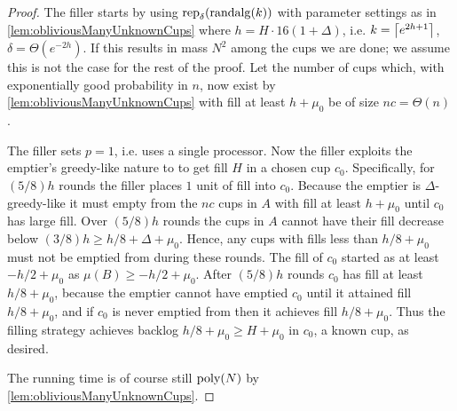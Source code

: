 \begin{proof}
  The filler starts by using $\operatorname{\text{\textup{rep}}}_\delta(\operatorname{\text{\textup{randalg}}}(k))$ with
  parameter settings as in \cref{lem:obliviousManyUnknownCups}
  where $h = H\cdot 16(1+\Delta)$, i.e. $k = \left\lceil e^{2h+1} \right\rceil$,
  $\delta = \Theta(e^{-2h})$. 
  If this results in mass $N^2$ among the cups we are done; we
  assume this is not the case for the rest of the proof.
  Let the number of cups which, with exponentially good
  probability in $n$, now exist by
  \cref{lem:obliviousManyUnknownCups} with
  fill at least $h+\mu_0$ be of size $nc = \Theta(n)$.

  The filler sets $p=1$, i.e. uses a single processor. Now the
  filler exploits the emptier's greedy-like nature to to get fill
  $H$ in a chosen cup $c_0$. Specifically, for $(5/8)h$ rounds
  the filler places $1$ unit of fill into $c_0$. Because the
  emptier is $\Delta$-greedy-like it must empty from the $nc$
  cups in $A$ with fill at least $h+\mu_0$ until $c_0$ has large
  fill. Over $(5/8)h$ rounds the cups in $A$ cannot have their
  fill decrease below $(3/8)h \ge h/8 + \Delta + \mu_0$. Hence,
  any cups with fills less than $h/8+\mu_0$ must not be emptied
  from during these rounds. The fill of $c_0$ started as at least
  $-h/2+\mu_0$ as $\mu(B) \ge -h/2+\mu_0$. After $(5/8)h$ rounds
  $c_0$ has fill at least $h/8+\mu_0$, because the emptier cannot
  have emptied $c_0$ until it attained fill $h/8+\mu_0$, and if
  $c_0$ is never emptied from then it achieves fill $h/8+\mu_0$.
  Thus the filling strategy achieves backlog $h/8 +\mu_0 \ge H +
  \mu_0$ in $c_0$, a known cup, as desired.

  The running time is of course still $\operatorname{\text{poly}}(N)$ by
  \cref{lem:obliviousManyUnknownCups}.

\end{proof}

